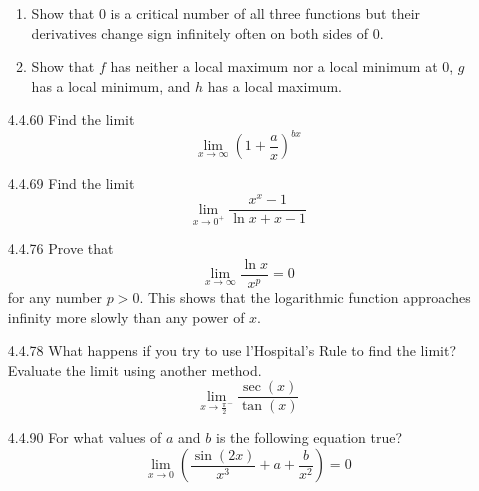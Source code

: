 \documentclass{article}
\begin{document}
\begin{enumerate}
    \begin{enumerate}
        \item Show that $0$ is a critical number of all three functions
            but their derivatives change sign infinitely often on
            both sides of $0$.
        \item Show that $f$ has neither a local maximum nor a
            local minimum at $0$, $g$ has a local minimum, and
            $h$ has a local maximum.
    \end{enumerate}

\vspace{8cm}

\item[4.4.60]
    Find the limit
    \[
        \lim_{x \to \infty} \left( 1+\frac{a}{x} \right)^{bx}
    \]

\vspace{4cm}


\item[4.4.69]
    Find the limit
    \[
        \lim_{x \to 0^{+}} \frac{x^{x}-1}{\ln x + x - 1}
    \]

\newpage

\item[4.4.76]
    Prove that
    \[
        \lim_{x \to \infty} \frac{\ln x}{x^{p}} = 0
    \]
    for any number $p>0$. This shows that the logarithmic function
    approaches infinity more slowly than any power of $x$.

\vspace{6cm}

\item[4.4.78]
    What happens if you try to use l'Hospital's Rule to find the limit?
    Evaluate the limit using another method.
    \[
        \lim_{x \to \frac{\pi}{2}^{-}}  \frac{\sec (x) }{\tan (x) }
    \]
\vspace{6cm}

\item[4.4.90]
    For what values of $a$ and $b$ is the following equation true?
    \[
        \lim_{x \to 0} \left( \frac{\sin (2x) }{x^{3}} + a + \frac{b}{x^{2}} \right) = 0
    \]
\end{enumerate}
\end{document}
